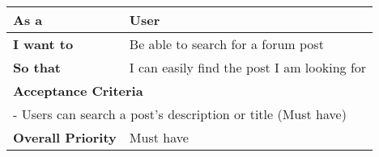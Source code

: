 \begin{table}[H]
    \begin{tabular}{|ll|}
    \hline
    \multicolumn{1}{|l|}{\textbf{As a}}             & User                                        \\ \hline
    \multicolumn{1}{|l|}{\textbf{I want to}}        & Be able to search for a forum post          \\ \hline
    \multicolumn{1}{|l|}{\textbf{So that}}          & I can easily find the post I am looking for \\ \hline
    \multicolumn{2}{|l|}{\textbf{Acceptance Criteria}}                                            \\ \hline
    \multicolumn{2}{|l|}{- Users can search a post's description or title (Must have)}            \\ \hline
    \multicolumn{1}{|l|}{\textbf{Overall Priority}} & Must have                                   \\ \hline
    \end{tabular}
\end{table}

